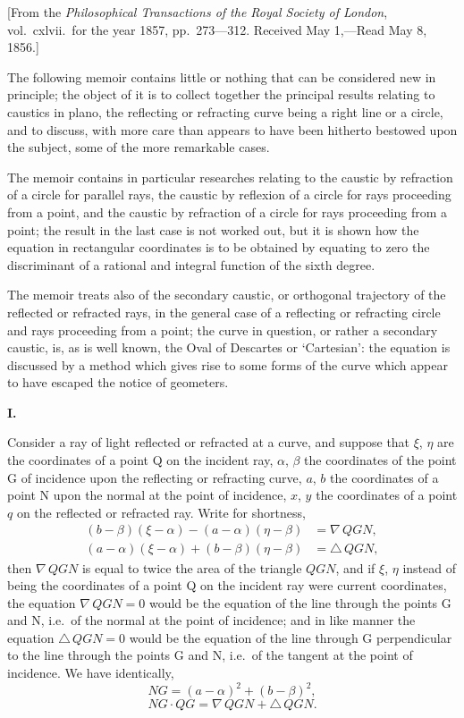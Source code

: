\documentclass[11pt,a4paper]{book}
\begin{document}
\begin{center}
[From the \textit{Philosophical Transactions of the Royal Society of London}, vol.~cxlvii.\ for the
year 1857, pp.~273---312. Received May 1,---Read May 8, 1856.]

\bigskip

The following memoir contains little or nothing that can be considered new in
principle; the object of it is to collect together the principal results relating to
caustics in plano, the reflecting or refracting curve being a right line or a circle,
and to discuss, with more care than appears to have been hitherto bestowed upon
the subject, some of the more remarkable cases.

The memoir contains in particular researches relating to the caustic by refraction
of a circle for parallel rays, the caustic by reflexion of a circle for rays proceeding
from a point, and the caustic by refraction of a circle for rays proceeding from a
point; the result in the last case is not worked out, but it is shown how the
equation in rectangular coordinates is to be obtained by equating to zero the
discriminant of a rational and integral function of the sixth degree.

The memoir treats also of the secondary caustic, or orthogonal trajectory of the
reflected or refracted rays, in the general case of a reflecting or refracting circle
and rays proceeding from a point; the curve in question, or rather a secondary
caustic, is, as is well known, the Oval of Descartes or `Cartesian': the equation is
discussed by a method which gives rise to some forms of the curve which appear
to have escaped the notice of geometers.

\medskip
\noindent\textbf{I.}

Consider a ray of light reflected or refracted at a curve, and suppose that
$\xi$, $\eta$ are the coordinates of a point Q on the incident ray, $\alpha$, $\beta$ the coordinates
of the point G of incidence upon the reflecting or refracting curve, $a$, $b$ the
coordinates of a point N upon the normal at the point of incidence, $x$, $y$ the
coordinates of a point $q$ on the reflected or refracted ray. Write for shortness,
\begin{align*}
(b-\beta)(\xi-\alpha) - (a-\alpha)(\eta-\beta) &= \nabla\,QGN,\\
(a-\alpha)(\xi-\alpha) + (b-\beta)(\eta-\beta) &= \triangle\,QGN,
\end{align*}
then $\nabla\,QGN$ is equal to twice the area of the triangle $QGN$, and if $\xi$,
$\eta$ instead of being the coordinates of a point Q on the incident ray were current
coordinates, the equation $\nabla\,QGN = 0$ would be the equation of the line through
the points G and N, i.e.\ of the normal at the point of incidence; and in like
manner the equation $\triangle\,QGN = 0$ would be the equation of the line through G
perpendicular to the line through the points G and N, i.e.\ of the tangent at the
point of incidence. We have identically,
\[NG = (a-\alpha)^2 + (b-\beta)^2,\]
\[NG \cdot QG = \nabla\,QGN + \triangle\,QGN.\]


\end{center}
\end{document}
